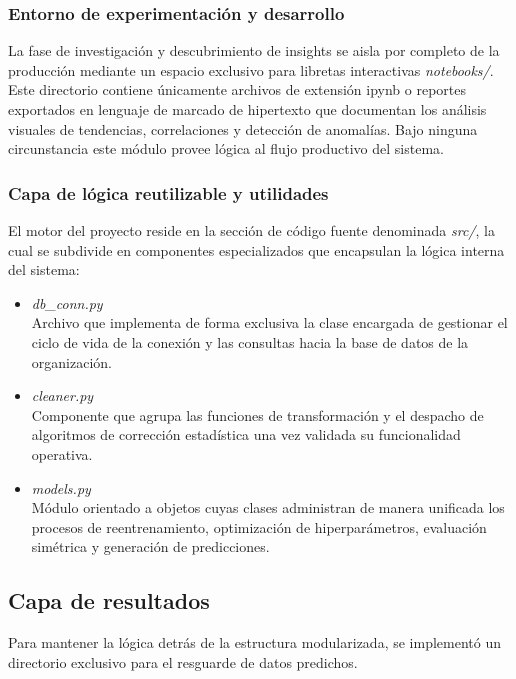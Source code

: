 \documentclass[11pt,a4paper]{report}
\begin{document}
    \subsubsection{Entorno de experimentación y desarrollo}
    La fase de investigación y descubrimiento de insights se aisla por completo de la producción mediante un
    espacio exclusivo para libretas interactivas \textit{notebooks/}.
    Este directorio contiene únicamente archivos de extensión ipynb o reportes exportados en lenguaje de marcado
    de hipertexto que documentan los análisis visuales de tendencias, correlaciones y detección de anomalías.
    Bajo ninguna circunstancia este módulo provee lógica al flujo productivo del sistema.

    \subsubsection{Capa de lógica reutilizable y utilidades}
    El motor del proyecto reside en la sección de código fuente denominada \textit{src/},
    la cual se subdivide en componentes especializados que encapsulan la lógica interna del sistema:

    \begin{itemize}
        \item  \textit{db\_conn.py}\\
        Archivo que implementa de forma exclusiva la clase encargada de gestionar el ciclo de vida de
        la conexión y las consultas hacia la base de datos de la organización.

        \item  \textit{cleaner.py}\\
        Componente que agrupa las funciones de transformación y el despacho de algoritmos
        de corrección estadística una vez validada su funcionalidad operativa.

        \item  \textit{models.py}\\
        Módulo orientado a objetos cuyas clases administran de manera unificada los procesos de reentrenamiento,
        optimización de hiperparámetros, evaluación simétrica y generación de predicciones.
    \end{itemize}

    \subsection{Capa de resultados}

    Para mantener la lógica detrás de la estructura modularizada, se implementó un directorio exclusivo para el resguarde de datos predichos.
\end{document}
